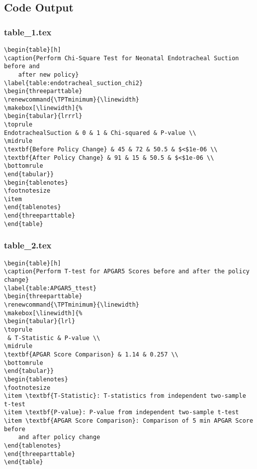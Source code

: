 \documentclass[11pt]{article}
\begin{document}
\subsection{Code Output}

\subsubsection*{table\_1.tex}

\begin{Verbatim}[tabsize=4]
\begin{table}[h]
\caption{Perform Chi-Square Test for Neonatal Endotracheal Suction before and
	after new policy}
\label{table:endotracheal_suction_chi2}
\begin{threeparttable}
\renewcommand{\TPTminimum}{\linewidth}
\makebox[\linewidth]{%
\begin{tabular}{lrrrl}
\toprule
EndotrachealSuction & 0 & 1 & Chi-squared & P-value \\
\midrule
\textbf{Before Policy Change} & 45 & 72 & 50.5 & $<$1e-06 \\
\textbf{After Policy Change} & 91 & 15 & 50.5 & $<$1e-06 \\
\bottomrule
\end{tabular}}
\begin{tablenotes}
\footnotesize
\item
\end{tablenotes}
\end{threeparttable}
\end{table}

\end{Verbatim}

\subsubsection*{table\_2.tex}

\begin{Verbatim}[tabsize=4]
\begin{table}[h]
\caption{Perform T-test for APGAR5 Scores before and after the policy change}
\label{table:APGAR5_ttest}
\begin{threeparttable}
\renewcommand{\TPTminimum}{\linewidth}
\makebox[\linewidth]{%
\begin{tabular}{lrl}
\toprule
 & T-Statistic & P-value \\
\midrule
\textbf{APGAR Score Comparison} & 1.14 & 0.257 \\
\bottomrule
\end{tabular}}
\begin{tablenotes}
\footnotesize
\item \textbf{T-Statistic}: T-statistics from independent two-sample t-test
\item \textbf{P-value}: P-value from independent two-sample t-test
\item \textbf{APGAR Score Comparison}: Comparison of 5 min APGAR Score before
	and after policy change
\end{tablenotes}
\end{threeparttable}
\end{table}

\end{Verbatim}




\end{document}
